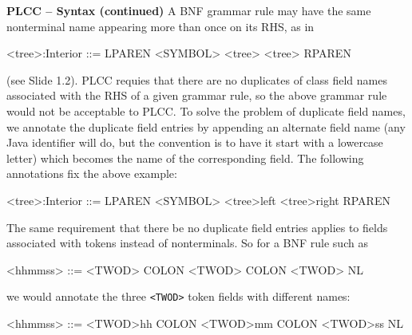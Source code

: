 \begin{minipage}[t]{\sw}
\slidenumber
\LARGE
{\bf PLCC -- Syntax (continued)}\exx
A BNF grammar rule may have the same nonterminal name appearing
more than once on its RHS, as in
{\Large
\begin{qv}
<tree>:Interior ::= LPAREN <SYMBOL> <tree> <tree> RPAREN
\end{qv}
}
(see Slide 1.2).
PLCC requies that there are no duplicates of class field names
associated with the RHS of a given grammar rule,
so the above grammar rule would not be acceptable to PLCC.
To solve the problem of duplicate field names,
we annotate the duplicate field entries
by appending an alternate field name
(any Java identifier will do, but the convention is
to have it start with a lowercase letter)
which becomes the name of the corresponding field.
The following annotations fix the above example:
{\Large
\begin{qv}
<tree>:Interior ::= LPAREN <SYMBOL> <tree>left <tree>right RPAREN
\end{qv}
}
The same requirement that there be no duplicate field entries
applies to fields associated with tokens instead of nonterminals.
So for a BNF rule such as
{\Large
\begin{qv}
<hhmmss> ::= <TWOD> COLON <TWOD> COLON <TWOD> NL
\end{qv}
}
we would annotate the three \verb'<TWOD>' token fields with different names:
{\Large
\begin{qv}
<hhmmss> ::= <TWOD>hh COLON <TWOD>mm COLON <TWOD>ss NL
\end{qv}
}
\end{minipage}
\clearpage
